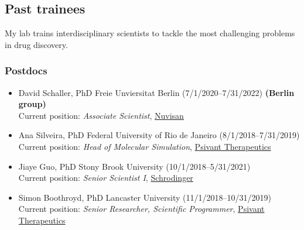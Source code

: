 \documentclass[10pt]{article}
\begin{document}
\subsection*{Past trainees}

My lab trains interdisciplinary scientists to tackle the most challenging problems in drug discovery.

\subsubsection*{Postdocs}

\begin{itemize}
  \item David Schaller, PhD Freie Unviersitat Berlin (7/1/2020--7/31/2022) {\bf (Berlin group)}\\
  Current position: \emph{Associate Scientist}, \href{https://www.nuvisan.com/}{Nuvisan}

  \item Ana Silveira, PhD Federal University of Rio de Janeiro (8/1/2018--7/31/2019)\\
  Current position: \emph{Head of Molecular Simulation}, \href{https://psivant.com/}{Psivant Therapeutics}  

  \item Jiaye Guo, PhD Stony Brook University (10/1/2018--5/31/2021)\\
  Current position: \emph{Senior Scientist I}, \href{http://schrodinger.com}{Schrodinger}
  
  \item Simon Boothroyd, PhD Lancaster University (11/1/2018--10/31/2019)\\
  Current position: \emph{Senior Researcher, Scientific Programmer}, \href{https://psivant.com/}{Psivant Therapeutics}  
  

\end{itemize}
\end{document}
